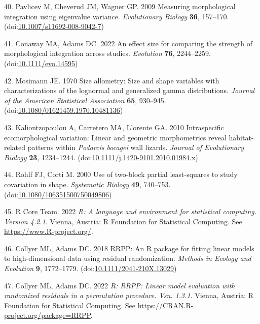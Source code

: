 \documentclass[
  11pt,
]{article}
\begin{document}
\leavevmode\hypertarget{ref-Pavlicev2009}{}%
40. Pavlicev M, Cheverud JM, Wagner GP. 2009 Measuring morphological
integration using eigenvalue variance. \emph{Evolutionary Biology}
\textbf{36}, 157--170.
(doi:\href{https://doi.org/10.1007/s11692-008-9042-7}{10.1007/s11692-008-9042-7})

\leavevmode\hypertarget{ref-ConawayAdams2022}{}%
41. Conaway MA, Adams DC. 2022 An effect size for comparing the strength
of morphological integration across studies. \emph{Evolution}
\textbf{76}, 2244--2259.
(doi:\href{https://doi.org/10.1111/evo.14595}{10.1111/evo.14595})

\leavevmode\hypertarget{ref-Mosimann1970}{}%
42. Mosimann JE. 1970 Size allometry: Size and shape variables with
characterizations of the lognormal and generalized gamma distributions.
\emph{Journal of the American Statistical Association} \textbf{65},
930--945.
(doi:\href{https://doi.org/10.1080/01621459.1970.10481136}{10.1080/01621459.1970.10481136})

\leavevmode\hypertarget{ref-KALIONTZOPOULOU2010}{}%
43. Kaliontzopoulou A, Carretero MA, Llorente GA. 2010 Intraspecific
ecomorphological variation: Linear and geometric morphometrics reveal
habitat-related patterns within \emph{Podarcis bocagei} wall lizards.
\emph{Journal of Evolutionary Biology} \textbf{23}, 1234--1244.
(doi:\href{https://doi.org/10.1111/j.1420-9101.2010.01984.x}{10.1111/j.1420-9101.2010.01984.x})

\leavevmode\hypertarget{ref-Rohlf2000}{}%
44. Rohlf FJ, Corti M. 2000 Use of two-block partial least-squares to
study covariation in shape. \emph{Systematic Biology} \textbf{49},
740--753.
(doi:\href{https://doi.org/10.1080/106351500750049806}{10.1080/106351500750049806})

\leavevmode\hypertarget{ref-RCT}{}%
45. R Core Team. 2022 \emph{R: A language and environment for
statistical computing. Version 4.2.1}. Vienna, Austria: R Foundation for
Statistical Computing. See \url{https://www.R-project.org/}.

\leavevmode\hypertarget{ref-CollyerAdams2018}{}%
46. Collyer ML, Adams DC. 2018 RRPP: An R package for fitting linear
models to high-dimensional data using residual randomization.
\emph{Methods in Ecology and Evolution} \textbf{9}, 1772--1779.
(doi:\href{https://doi.org/10.1111/2041-210X.13029}{10.1111/2041-210X.13029})

\leavevmode\hypertarget{ref-RRPP}{}%
47. Collyer ML, Adams DC. 2022 \emph{R: RRPP: Linear model evaluation
with randomized residuals in a permutation procedure. Vsn. 1.3.1}.
Vienna, Austria: R Foundation for Statistical Computing. See
\url{https://CRAN.R-project.org/package=RRPP}.
\end{document}
